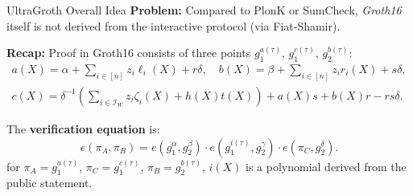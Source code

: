 \documentclass{zkdl-presentation-template}
\begin{document}
\begin{frame}{UltraGroth Overall Idea}
    \textbf{Problem:} Compared to PlonK or SumCheck, \textit{Groth16} itself is
    not derived from the interactive protocol (via Fiat-Shamir).

    \textbf{Recap:} Proof in Groth16 consists of three points $g_1^{a(\tau)}$,
    $g_1^{c(\tau)}$, $g_2^{b(\tau)}$:
    \begin{gather*}
        a(X) = \alpha + \sum_{i \in [n]}z_i\ell_i(X) + r\delta, \quad b(X) = \beta + \sum_{i \in [n]}z_ir_i(X) + s\delta, \\
        c(X) = \delta^{-1}\left(\sum_{i \in \mathcal{I}_W} z_i\zeta_i(X)+h(X)t(X)\right) + a(X)s + b(X)r - rs\delta.    
    \end{gather*}

     The \textbf{verification equation} is:
    \begin{equation*}
        e(\pi_A,\pi_B) = e(g_1^{\alpha},g_2^{\beta})\cdot e(g_1^{i(\tau)},g_2^{\gamma})\cdot e(\pi_C,g_2^{\delta}).
    \end{equation*}
    for $\pi_A = g_1^{a(\tau)}$, $\pi_C = g_1^{c(\tau)}$, $\pi_B =
    g_2^{b(\tau)}$, $i(X)$ is a polynomial derived from the public statement.
\end{frame}
\end{document}
